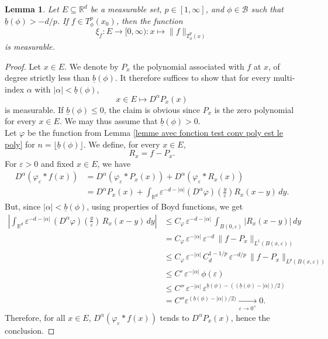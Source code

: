 \documentclass[a4paper,10pt]{article}
\theoremstyle{thmstyleone}%
\theoremstyle{thmstyletwo}%
\newtheorem{lemma}{Lemma}%
\theoremstyle{thmstylethree}%
\begin{document}
\begin{lemma}\label{lemme 1 Rademacher}
Let $E \subseteq \mathbb{R}^d$ be a measurable set, $p \in [1,\infty]$, and $\phi \in \mathcal{B}$ such that $\underline{b}(\phi) > -d/p$. If $f \in T^p_\phi(x_0)$, then the function
\[
\xi_f : E \rightarrow [0,\infty) : x \mapsto \|f\|_{T^p_\phi(x)}
\]
is measurable.
\end{lemma}
\begin{proof}
Let $x \in E$. We denote by $P_x$ the polynomial associated with $f$ at $x$, of degree strictly less than $\underline{b}(\phi)$.
It therefore suffices to show that for every multi-index $\alpha$ with $|\alpha| < \underline{b}(\phi)$,
\[
x \in E \mapsto D^\alpha P_x(x)
\]
is measurable.  
If $\underline{b}(\phi) \leq 0$, the claim is obvious since $P_x$ is the zero polynomial for every $x \in E$. We may thus assume that $\underline{b}(\phi) > 0$.
\smallskip
\\Let $\varphi$ be the function from Lemma \ref{lemme avec fonction test conv poly est le poly} for $n=\lfloor\underline{b}(\phi)\rfloor$. \smallskip
We define, for every $x \in E$,
\[
R_x = f - P_x.
\]
For $\varepsilon > 0$ and fixed $x \in E$, we have
\begin{align*}
D^\alpha \left(\varphi_\varepsilon \ast f(x)\right)
&= D^\alpha \left(\varphi_\varepsilon \ast P_x(x)\right) + D^\alpha \left(\varphi_\varepsilon \ast R_x(x)\right) \\
&= D^\alpha P_x(x) + \int_{\mathbb{R}^d} \varepsilon^{-d - |\alpha|} (D^\alpha \varphi)\left(\frac{y}{\varepsilon}\right) R_x(x - y) \, dy.
\end{align*}
But, since $|\alpha|<\underline{b}(\phi)$, using properties of Boyd functions, we get 
\begin{align*}
\left|\int_{\mathbb{R}^d}\varepsilon^{-d-|\alpha|}\,(D^\alpha \varphi)\left(\frac{y}{\varepsilon}\right)\,R_x(x-y)\,dy\right|
&\leq C_\varphi\,\varepsilon^{-d-|\alpha|}\,\int_{B(0,\varepsilon)}|R_x(x-y)|\,dy\\
&=C_\varphi\,\varepsilon^{-|\alpha|}\,\varepsilon^{-d}\,\|f-P_x\|_{L^1(B(x,\varepsilon))}\\
&\leq C_\varphi\,\varepsilon^{-|\alpha|}\,C_d^{1-1/p} \,\varepsilon^{-d/p}\,\|f-P_x\|_{L^p(B(x,\varepsilon))}\\
&\leq C'\,\varepsilon^{-|\alpha|}\,\phi(\varepsilon)\\
&\leq C''\,\varepsilon^{-|\alpha|}\,\varepsilon^{\underline{b}(\phi)-((\underline{b}(\phi)-|\alpha|)/2)}\\
&= C'' \varepsilon^{(\underline{b}(\phi)-|\alpha|)/2)}\underset{\varepsilon\rightarrow 0^+}{\longrightarrow}0.
\end{align*}
Therefore, for all $x\in E$, $D^\alpha\left(\varphi_\varepsilon \ast f(x)\right)$ tends to $D^\alpha P_x(x)$, hence the conclusion.
\end{proof}
\end{document}
